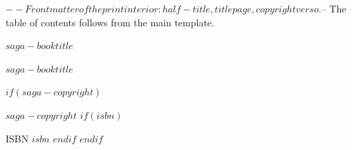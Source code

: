 $-- Front matter of the print interior: half-title, title page, copyright verso.
$-- The table of contents follows from the main template.
\frontmatter
\newcommand{\sagabooktitle}{$saga-booktitle$}
\pagestyle{empty}
\thispagestyle{empty}

\null\vspace{0.3\textheight}
\begin{center}
{\normalfont\fontsize{26}{30}\selectfont $saga-booktitle$\par}
\end{center}
\cleardoublepage

\thispagestyle{empty}
\null\vspace{0.1\textheight}
\begin{center}
{\normalfont\large{}\par}
\vspace{1.4\baselineskip}
\sagaornament
\vspace{3\baselineskip}
{\normalfont\large{}\par}
\vspace{1.2\baselineskip}
{\normalfont\fontsize{34}{38}\selectfont $saga-booktitle$\par}
\vspace{3\baselineskip}
\sagaornament
\vfill
{\normalfont\Large{}\par}
\vspace{0.12\textheight}
\end{center}
\clearpage

\thispagestyle{empty}
$if(saga-copyright)$
\begingroup
\small\raggedright
\setlength{\parindent}{0pt}\setlength{\parskip}{0.5\baselineskip}
\null\vfill
$saga-copyright$
$if(isbn)$
\par\noindent ISBN $isbn$
$endif$
\endgroup
$endif$
\cleardoublepage
\pagestyle{scrheadings}

\let\sagamainmatter\mainmatter
\let\sagabackmatter\backmatter
\let\mainmatter\relax
\let\backmatter\relax
